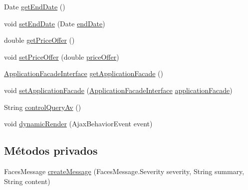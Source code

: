 \begin{DoxyCompactItemize}
Date \mbox{\hyperlink{classcom_1_1ruralhousejsf_1_1model_1_1availability_1_1_set_availability_bean_a6a42faf50c5cf766285bf4018c19d477}{get\+End\+Date}} ()
\item 
void \mbox{\hyperlink{classcom_1_1ruralhousejsf_1_1model_1_1availability_1_1_set_availability_bean_a29c747d6a871c8c0f1eb3806461b1d32}{set\+End\+Date}} (Date \mbox{\hyperlink{classcom_1_1ruralhousejsf_1_1model_1_1availability_1_1_set_availability_bean_a1620f454f1d1fe18418037a9490744cd}{end\+Date}})
\item 
double \mbox{\hyperlink{classcom_1_1ruralhousejsf_1_1model_1_1availability_1_1_set_availability_bean_a264ab7e009d744abc40af63581bbdb05}{get\+Price\+Offer}} ()
\item 
void \mbox{\hyperlink{classcom_1_1ruralhousejsf_1_1model_1_1availability_1_1_set_availability_bean_a89e2a4719579d3e5865dd940bf7c5649}{set\+Price\+Offer}} (double \mbox{\hyperlink{classcom_1_1ruralhousejsf_1_1model_1_1availability_1_1_set_availability_bean_a3887b9317413abac9db351e53198f03b}{price\+Offer}})
\item 
\mbox{\hyperlink{interfacecom_1_1ruralhousejsf_1_1business_logic_1_1_application_facade_interface}{Application\+Facade\+Interface}} \mbox{\hyperlink{classcom_1_1ruralhousejsf_1_1model_1_1availability_1_1_set_availability_bean_af9224c4f771a27c9e3c9218d1700bbcb}{get\+Application\+Facade}} ()
\item 
void \mbox{\hyperlink{classcom_1_1ruralhousejsf_1_1model_1_1availability_1_1_set_availability_bean_ae9e4275c9099e9b5ccfdcc07a7592c65}{set\+Application\+Facade}} (\mbox{\hyperlink{interfacecom_1_1ruralhousejsf_1_1business_logic_1_1_application_facade_interface}{Application\+Facade\+Interface}} \mbox{\hyperlink{classcom_1_1ruralhousejsf_1_1model_1_1availability_1_1_set_availability_bean_a1761e4ea575572afa2a495de5eadbd7b}{application\+Facade}})
\item 
String \mbox{\hyperlink{classcom_1_1ruralhousejsf_1_1model_1_1availability_1_1_set_availability_bean_ae291ccc259e4e415f8ec7f52fb4a28da}{control\+Query\+Av}} ()
\item 
void \mbox{\hyperlink{classcom_1_1ruralhousejsf_1_1model_1_1availability_1_1_set_availability_bean_aabfcb63b56f07d5d00cf4c44f413a6f8}{dynamic\+Render}} (Ajax\+Behavior\+Event event)
\end{DoxyCompactItemize}
\subsection*{Métodos privados}
\begin{DoxyCompactItemize}
\item 
Faces\+Message \mbox{\hyperlink{classcom_1_1ruralhousejsf_1_1model_1_1availability_1_1_set_availability_bean_a827001537a7a94df4b1949dc97d9fcf3}{create\+Message}} (Faces\+Message.\+Severity severity, String summary, String content)
\end{DoxyCompactItemize}
